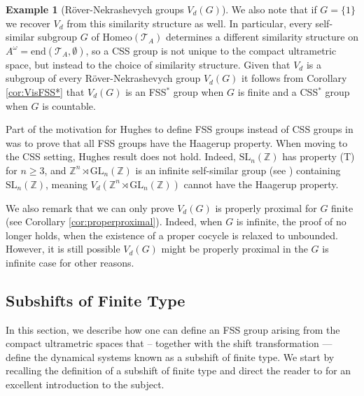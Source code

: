 \documentclass[12pt]{amsart}
\numberwithin{equation}{subsection}
\theoremstyle{definition}
\theoremstyle{definition}
\newtheorem{example}[theorem]{Example}
\theoremstyle{remark}
\begin{document}
\begin{example}[R\"over-Nekrashevych groups $V_d(G)$]
We also note that if $G = \{1\}$ we recover $V_d$ from this similarity structure as well. In particular, every self-similar subgroup $G$ of Homeo$(\mathcal T_A)$ determines a different similarity structure on $A^\omega = \text{end}(\mathcal T_A,\emptyset)$, so a CSS group is not unique to the compact ultrametric space, but instead to the choice of similarity structure. Given that $V_d$ is a subgroup of every R\"over-Nekrashevych group $V_d(G)$ it follows from Corollary \ref{cor:VisFSS*} that $V_d(G)$ is an FSS$^*$ group when $G$ is finite and a CSS$^*$ group when $G$ is countable. 


Part of the motivation for Hughes to define FSS groups instead of CSS groups in \cite{hughes2009} was to prove that all FSS groups have the Haagerup property. When moving to the CSS setting, Hughes result does not hold. Indeed, $\text{SL}_{n}(\mathbb{Z})$ has property (T) for $n \ge 3$, and $\mathbb{Z}^n \rtimes \text{GL}_n(\mathbb{Z})$ is an infinite self-similar group (see \cite{Scott1984}) containing $\text{SL}_n(\mathbb{Z})$, meaning $V_d(\mathbb{Z}^n \rtimes \text{GL}_n(\mathbb{Z}))$ cannot have the Haagerup property. 

We also remark that we can only prove $V_d(G)$ is properly proximal for $G$ finite (see Corollary \ref{cor:properproximal}). Indeed, when $G$ is infinite, the proof of \cite[Propostion 1.6]{boutonnet2021properly} no longer holds, when the existence of a proper cocycle is relaxed to unbounded. However, it is still possible $V_d(G)$ might be properly proximal in the $G$ is infinite case for other reasons.



\end{example}



\subsection{Subshifts of Finite Type}\label{sec:SFT}

In this section, we describe how one can define an FSS group arising from the compact ultrametric spaces that -- together with the shift transformation --- define the dynamical systems known as a subshift of finite type. We start by recalling the definition of a subshift of finite type and direct the reader to \cite{kitchens1998} for an excellent introduction to the subject.  
\end{document}
